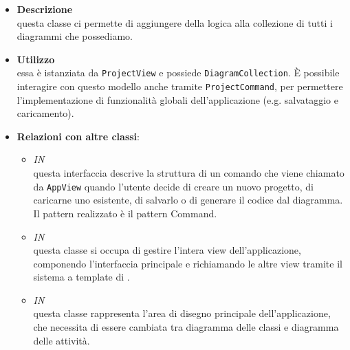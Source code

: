 \label{\nogloxy{swedesigner::client::model::ProjectModel}}
\begin{itemize}
\item \textbf{Descrizione}\\
questa classe ci permette di aggiungere della logica alla collezione di tutti i diagrammi che possediamo.
\item \textbf{Utilizzo}\\
essa è istanziata da \texttt{ProjectView} e possiede \texttt{DiagramCollection}. È possibile interagire con questo modello anche tramite \texttt{ProjectCommand}, per permettere l'implementazione di funzionalità globali dell'applicazione (e.g. salvataggio e caricamento).
\item \textbf{Relazioni con altre classi}:
\begin{itemize}
\item \textit{IN} \hyperref[\nogloxy{swedesigner::client::model::ProjectCommand}]{}\\
questa interfaccia descrive la struttura di un comando che viene chiamato da \texttt{AppView} quando l'utente decide di creare un nuovo progetto, di caricarne uno esistente, di salvarlo o di generare il codice dal diagramma. Il pattern realizzato è il pattern Command.
\item \textit{IN} \hyperref[\nogloxy{swedesigner::client::view::AppView}]{}\\
questa classe si occupa di gestire l'intera view dell'applicazione, componendo l'interfaccia principale e richiamando le altre view tramite il sistema a template di \backbonejs{}.
\item \textit{IN} \hyperref[\nogloxy{swedesigner::client::view::ProjectView}]{}\\
questa classe rappresenta l'area di disegno principale dell'applicazione, che necessita di essere cambiata tra diagramma delle classi e diagramma delle attività. 
\end{itemize}
\end{itemize}
\subsection{}
\label{\nogloxy{swedesigner::client::model::celltypes}}
